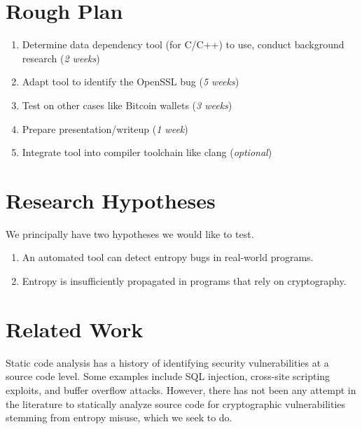 \documentclass[letterpaper,twocolumn,10pt]{article}
\begin{document}
\section{Rough Plan}

\begin{enumerate}
	\item Determine data dependency tool (for C/C++) to use, conduct background research (\textit{2 weeks})
	\item Adapt tool to identify the OpenSSL bug (\textit{5 weeks})
	\item Test on other cases like Bitcoin wallets (\textit{3 weeks})
	\item Prepare presentation/writeup (\textit{1 week})
	\item Integrate tool into compiler toolchain like clang (\textit{optional})
\end{enumerate}

\section{Research Hypotheses}

We principally have two hypotheses we would like to test.

\begin{enumerate}
	\item An automated tool can detect entropy bugs in real-world programs.
	\item Entropy is insufficiently propagated in programs that rely on cryptography.
\end{enumerate}

\section{Related Work}

Static code analysis has a history of identifying security vulnerabilities at a source code level.
Some examples include SQL injection, cross-site scripting exploits, and buffer overflow attacks. However,
there has not been any attempt in the literature to statically analyze source code for cryptographic
vulnerabilities stemming from entropy misuse, which we seek to do.

\end{document}
